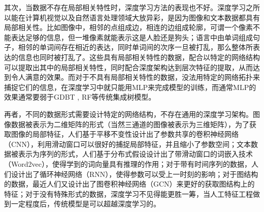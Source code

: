 其次，当数据不存在局部相关特性时，深度学习方法的表现也不好。深度学习之所以能在计算机视觉以及自然语言处理领域大放异彩，是因为图像和文本数据都具有局部相关性。比如图像中，相邻的点组成边，相连的边组成轮廓，可谓一个像素不能表达足够的信息，但一堆像素就能表示这是人脸还是狗头；语言中由单词组成句子，相邻的单词间存在相近的表达，同时单词间的次序一旦被打乱，那么整体所表达的信息也同时被打乱了。这些具有局部相关特性的数据，配合以特定的网络结构可以提取出其中的局部相关特性，同时配合深度架构达到层次特征的提取，从而达到令人满意的效果。而对于不具有局部相关特性的数据，没法用特定的网络拓扑来捕捉它们的信息，在深度学习中就只能用MLP来完成模型的训练，而通常MLP的效果通常要弱于GDBT , RF等传统集成树模型。

再者，不同的数据形式需要设计特定的网络结构，不存在通用的深度学习架构。图像数据被表示为二维矩阵的形式（当然三通道的图像被表示为三维矩阵），为了获取图像的局部特征，人们基于平移不变性设计出了参数共享的卷积神经网络（CNN），利用滑动窗口可以很好的捕捉局部特征，并且缩小了参数空间；文本数据被表示为序列的形式，人们基于分布式假设设计出了带滑动窗口的词嵌入技术（Word2vec），使得学到的词向量具有推理的作用；对于带有时间序列的数据，人们设计出了循环神经网络（RNN），使得参数可以受上一时刻的影响；对于图结构的数据，最近人们又设计出了图卷积神经网络（GCN）来更好的获取图结构上的特征；对于没有特殊形式的数据，深度学习不见得能更胜一筹，当人工特征工程做到一定程度后，传统模型是可以超越深度学习的。